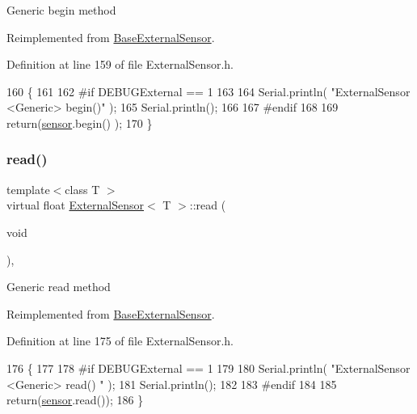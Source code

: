 Generic begin method 

Reimplemented from \hyperlink{class_base_external_sensor_a87d132803d4f4fdd4e66332809f0c9a0}{Base\+External\+Sensor}.



Definition at line 159 of file External\+Sensor.\+h.


\begin{DoxyCode}
160     \{
161     
162 \textcolor{preprocessor}{    #if DEBUGExternal == 1 }
163 
164         Serial.println( \textcolor{stringliteral}{"ExternalSensor <Generic> begin()"} );
165         Serial.println();
166     
167 \textcolor{preprocessor}{    #endif}
168 
169         \textcolor{keywordflow}{return}(\hyperlink{class_external_sensor_a6e1f518119abe08c14b498ce24a7e1b3}{sensor}.begin() );  
170     \}
\end{DoxyCode}
\mbox{\label{class_external_sensor_a5fb3afc7d244fb86dac68ab5481bc407}} 
\subsubsection{\texorpdfstring{read()}{read()}}
{\footnotesize\ttfamily template$<$class T $>$ \\
virtual float \hyperlink{class_external_sensor}{External\+Sensor}$<$ T $>$\+::read (\begin{DoxyParamCaption}\item[{void}]{ }\end{DoxyParamCaption})\hspace{0.3cm}{\ttfamily [inline]}, {\ttfamily [virtual]}}

Generic read method 

Reimplemented from \hyperlink{class_base_external_sensor_a1564f16deacf57b51b9948ac29db4291}{Base\+External\+Sensor}.



Definition at line 175 of file External\+Sensor.\+h.


\begin{DoxyCode}
176     \{
177     
178 \textcolor{preprocessor}{    #if DEBUGExternal == 1 }
179 
180         Serial.println( \textcolor{stringliteral}{"ExternalSensor <Generic> read() "} );
181         Serial.println();
182         
183 \textcolor{preprocessor}{    #endif}
184 
185         \textcolor{keywordflow}{return}(\hyperlink{class_external_sensor_a6e1f518119abe08c14b498ce24a7e1b3}{sensor}.read());
186     \}
\end{DoxyCode}


